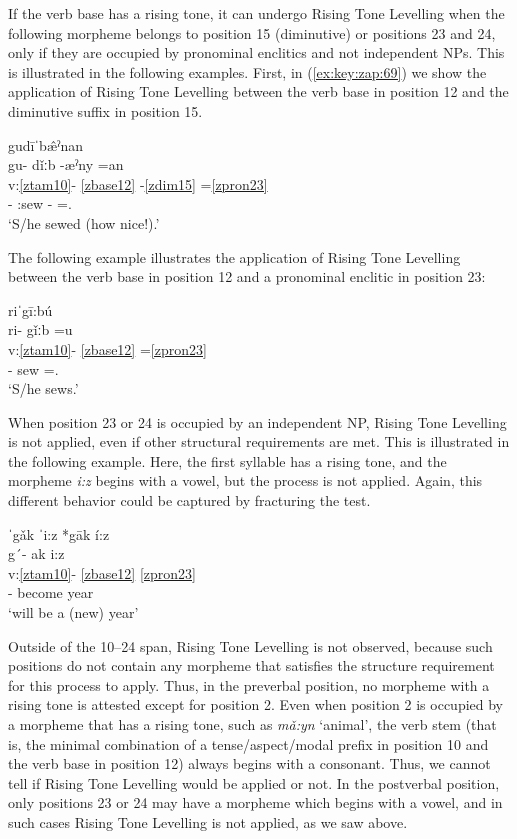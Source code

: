 \documentclass[output=paper]{langscibook}
\begin{document}
If the verb base has a rising tone, it can undergo Rising Tone Levelling when the following morpheme belongs to position 15 (diminutive) or positions 23 and 24, only if they are occupied by pronominal enclitics and not independent NPs. This is illustrated in the following examples. First, in (\ref{ex:key:zap:69}) we show the application of Rising Tone Levelling between the verb base in position 12 and the diminutive suffix in position 15. 

\ea\label{ex:key:zap:69}
{gudīˈb\^{æ}ˀnan}\\
\glll gu- dǐːb -æˀny =an\\
v:\ref{ztam10}- \ref{zbase12} {}-\ref{zdim15} =\ref{zpron23} \\
\Compl{}- \Compl{}:sew -\Dim{} =\Third\Sg{}.\Inf{}\\
\glt `S/he sewed (how nice!).'
\z

The following example illustrates the application of Rising Tone Levelling between the verb base in position 12 and a pronominal enclitic in position 23:

\ea\label{ex:key:zap:70}
{riˈgī:bú}\\
\glll ri- gǐːb =u\\
v:\ref{ztam10}- \ref{zbase12} =\ref{zpron23} \\ 
\Hab{}- sew =\Second\Sg{}.\Inf{}\\
\glt `S/he sews.'
\z

When position 23 or 24 is occupied by an independent NP, Rising Tone Levelling is not applied, even if other structural requirements are met. This is illustrated in the following example. Here, the first syllable has a rising tone, and the morpheme \textit{i:z} begins with a vowel, but the process is not applied. Again, this different behavior could be captured by fracturing the test.

\ea\label{ex:key:zap:71}
{ˈgǎk ˈi:z  \hspace{3cm}  *gāk í:z}\\
\glll g´- ak i:z\\
v:\ref{ztam10}- \ref{zbase12}  \ref{zpron23} \\
\Pot{}- become year\\
\glt `will be a (new) year'
\z

Outside of the 10--24 span, Rising Tone Levelling is not observed, because such positions do not contain any morpheme that satisfies the structure requirement for this process to apply. Thus, in the preverbal position, no morpheme with a rising tone is attested except for position 2. Even when position 2 is occupied by a morpheme that has a rising tone, such as \textit{mǎ:yn} `animal', the verb stem (that is, the minimal combination of a tense/aspect/modal prefix in position 10 and the verb base in position 12) always begins with a consonant. Thus, we cannot tell if Rising Tone Levelling would be applied or not. In the postverbal position, only positions 23 or 24 may have a morpheme which begins with a vowel, and in such cases Rising Tone Levelling is not applied, as we saw above. 
\end{document}
